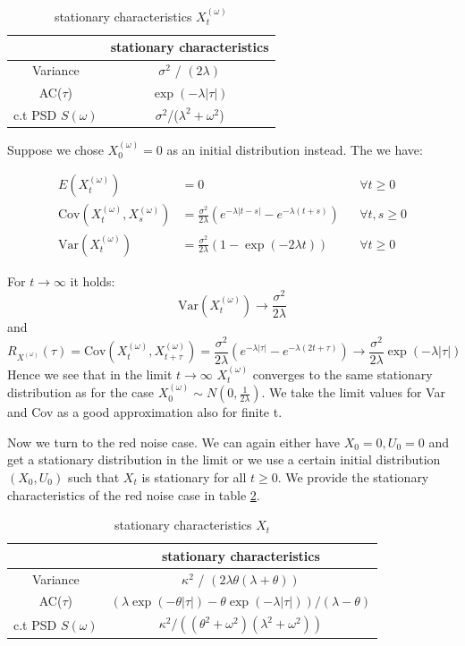 \documentclass[%
thesis=student,%
coverpage=false,%
titlepage=false,%
headmarks=true, %
german,%
font=libertine, %
math=newpxtx, %
BCOR=5mm,%
coverBCOR=11mm%
]{tumbook}
\begin{document}
\begin{table}[t]
\centering
\begin{tabular}{|c|c|}
\hline
& stationary characteristics\\
\hline
Variance & $\sigma^2$ / $(2\lambda)$\\
AC($\tau$) & $\exp(-\lambda |\tau|)$\\
c.t PSD $S(\omega)$ & $\sigma^2$/($\lambda^2 + \omega^2$)\\
\hline
\end{tabular}
\caption{stationary characteristics $X_{t}^{(\omega)}$}
\label{tab:white_noise_stat_char}
\end{table}

Suppose we chose $X_{0}^{(\omega)} = 0$ as an initial distribution instead. The we have:

 \begin{align*}
    E(X_{t}^{(\omega)}) &= 0   && \forall t \geq 0 \\
    \text{Cov}(X_{t}^{(\omega)},X_{s}^{(\omega)}) &= \frac{\sigma ^2}{2\lambda}(e^{-\lambda\lvert t-s \rvert}-e^{-\lambda(t+s)}) && \forall t, s \geq 0 \\
    \text{Var}(X_{t}^{(\omega)}) &= \frac{\sigma^2}{2\lambda}(1-\exp(-2\lambda t)) && \forall t \geq 0 
\end{align*}

For $t\rightarrow \infty$ it holds: 
\[
\text{Var}(X_{t}^{(\omega)})\rightarrow\frac{\sigma^2}{2\lambda}
\]
and 
\[
R_{X^{(\omega)}}(\tau) =\text{Cov}(X_{t}^{(\omega)},X_{t+\tau}^{(\omega)}) = \frac{\sigma^2}{2\lambda}(e^{-\lambda\lvert \tau \rvert} - e^{-\lambda(2t + \tau)}) \rightarrow \frac{\sigma ^2}{2\lambda}\exp(-\lambda\lvert \tau \rvert)
\]
Hence we see that in the limit $t\rightarrow \infty$ $X_{t}^{(\omega)}$ converges to the same stationary distribution as for the case $X_{0}^{(\omega)} \sim N(0,\frac{1}{2\lambda})$. 
We take the limit values for Var and Cov as a good approximation also for finite t.

Now we turn to the red noise case. We can again either have $X_{0} = 0, U_{0} = 0$ and get a stationary distribution in the limit or we use a certain initial distribution $(X_{0},U_{0})$ such that $X_{t}$ is stationary for all $t \geq 0$. We provide the stationary characteristics of the red noise case in table \ref{tab:red_noise_stat_char}.

\begin{table}[h!]
\centering
\begin{tabular}{|c|c|}
\hline
& stationary characteristics\\
\hline
Variance & $\kappa^2$ / $(2\lambda\theta(\lambda + \theta))$\\
AC($\tau$) & $(\lambda\exp(-\theta\lvert\tau\rvert)-\theta\exp(-\lambda\lvert\tau\rvert))/(\lambda - \theta)$\\
c.t PSD $S(\omega)$ & $\kappa^2/((\theta^2 + \omega^2)(\lambda^2 + \omega^2))$\\
\hline
\end{tabular}
\caption{stationary characteristics $X_{t}$}
\label{tab:red_noise_stat_char}
\end{table}
\end{document}
